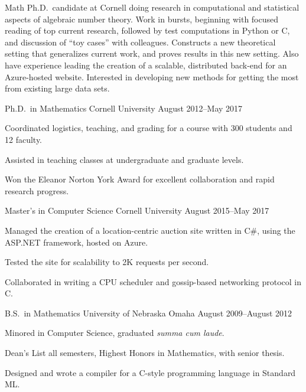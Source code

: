 \documentclass[11pt, letterpaper]{awesome-cv}
\begin{document}
\makecvheader






\begin{cvparagraph}
Math Ph.D.~candidate at Cornell doing research in computational and statistical aspects of algebraic number theory. Work in bursts, beginning with focused reading of top current research, followed by test computations in Python or C, and discussion of ``toy cases'' with colleagues. Constructs a new theoretical setting that generalizes current work, and proves results in this new setting. Also have experience leading the creation of a scalable, distributed back-end for an Azure-hosted website. Interested in developing new methods for getting the most from existing large data sets. 
\end{cvparagraph}






\begin{cventries}

\cventry
	{Ph.D.~in Mathematics}
	{Cornell University}
	{}
	{August 2012--May 2017}
	{
		\begin{cvitems}
			\item{Coordinated logistics, teaching, and grading for a course with 300 students and 12 faculty.}
			\item{Assisted in teaching classes at undergraduate and graduate levels.}
			\item{Won the Eleanor Norton York Award for excellent collaboration and rapid research progress.}
		\end{cvitems}
	}
	
\cventry
	{Master's in Computer Science}
	{Cornell University}
	{}
	{August 2015--May 2017}
	{
		\begin{cvitems}
			\item{Managed the creation of a location-centric auction site written in C\#, using the ASP.NET framework, hosted on Azure.}
			\item{Tested the site for scalability to 2K requests per second.}
			\item{Collaborated in writing a CPU scheduler and gossip-based networking protocol in C.}
		\end{cvitems}
	}
	
\cventry
	{B.S.~in Mathematics}
	{University of Nebraska Omaha}
	{}
	{August 2009--August 2012}
	{
		\begin{cvitems}
			\item{Minored in Computer Science, graduated \emph{summa cum laude}.}
			\item{Dean's List all semesters, Highest Honors in Mathematics, with senior thesis.}
			\item{Designed and wrote a compiler for a C-style programming language in Standard ML.}
		\end{cvitems}
	}
	
\end{cventries}
\end{document}
